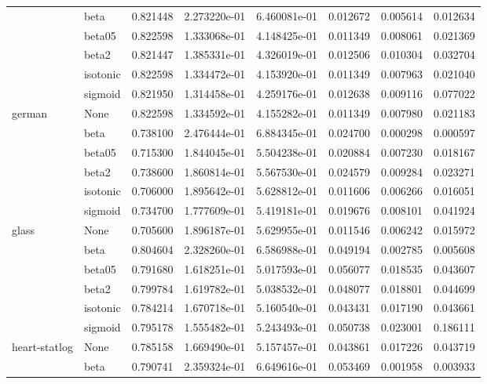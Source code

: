 \begin{tabular}{llrrrrrr}
        & beta &  0.821448 &  2.273220e-01 &  6.460081e-01 &  0.012672 &  0.005614 &  0.012634 \\
        & beta05 &  0.822598 &  1.333068e-01 &  4.148425e-01 &  0.011349 &  0.008061 &  0.021369 \\
        & beta2 &  0.821447 &  1.385331e-01 &  4.326019e-01 &  0.012506 &  0.010304 &  0.032704 \\
        & isotonic &  0.822598 &  1.334472e-01 &  4.153920e-01 &  0.011349 &  0.007963 &  0.021040 \\
        & sigmoid &  0.821950 &  1.314458e-01 &  4.259176e-01 &  0.012638 &  0.009116 &  0.077022 \\
german & None &  0.822598 &  1.334592e-01 &  4.155282e-01 &  0.011349 &  0.007980 &  0.021183 \\
        & beta &  0.738100 &  2.476444e-01 &  6.884345e-01 &  0.024700 &  0.000298 &  0.000597 \\
        & beta05 &  0.715300 &  1.844045e-01 &  5.504238e-01 &  0.020884 &  0.007230 &  0.018167 \\
        & beta2 &  0.738600 &  1.860814e-01 &  5.567530e-01 &  0.024579 &  0.009284 &  0.023271 \\
        & isotonic &  0.706000 &  1.895642e-01 &  5.628812e-01 &  0.011606 &  0.006266 &  0.016051 \\
        & sigmoid &  0.734700 &  1.777609e-01 &  5.419181e-01 &  0.019676 &  0.008101 &  0.041924 \\
glass & None &  0.705600 &  1.896187e-01 &  5.629955e-01 &  0.011546 &  0.006242 &  0.015972 \\
        & beta &  0.804604 &  2.328260e-01 &  6.586988e-01 &  0.049194 &  0.002785 &  0.005608 \\
        & beta05 &  0.791680 &  1.618251e-01 &  5.017593e-01 &  0.056077 &  0.018535 &  0.043607 \\
        & beta2 &  0.799784 &  1.619782e-01 &  5.038532e-01 &  0.048077 &  0.018801 &  0.044699 \\
        & isotonic &  0.784214 &  1.670718e-01 &  5.160540e-01 &  0.043431 &  0.017190 &  0.043661 \\
        & sigmoid &  0.795178 &  1.555482e-01 &  5.243493e-01 &  0.050738 &  0.023001 &  0.186111 \\
heart-statlog & None &  0.785158 &  1.669490e-01 &  5.157457e-01 &  0.043861 &  0.017226 &  0.043719 \\
        & beta &  0.790741 &  2.359324e-01 &  6.649616e-01 &  0.053469 &  0.001958 &  0.003933 \\

\end{tabular}
